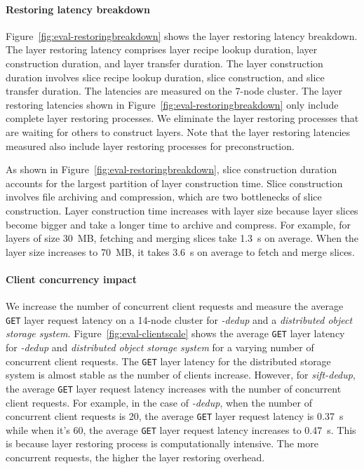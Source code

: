 \paragraph{Restoring latency breakdown}

Figure~\ref{fig:eval-restoringbreakdown} shows 
the layer restoring latency breakdown.
The layer restoring latency comprises layer recipe lookup duration, layer construction duration, and layer transfer duration.
The layer construction duration involves slice recipe lookup duration, slice construction, and slice transfer duration.
%
The latencies are measured on the 7-node cluster.
The layer restoring latencies shown in Figure~\ref{fig:eval-restoringbreakdown} only include complete layer restoring processes. 
We eliminate the layer restoring processes that are waiting for others to construct layers.
Note that the layer restoring latencies measured also include layer restoring processes for preconstruction.

As shown in Figure~\ref{fig:eval-restoringbreakdown}, slice construction duration accounts for the largest partition of layer construction time.
Slice construction involves file archiving and compression, which are two bottlenecks of slice construction. 
Layer construction time increases with layer size because layer slices become bigger and take a longer time to archive and compress.
For example, for layers of size 30~MB, fetching and merging slices take 1.3~s on average.
When the layer size increases to 70~MB, it takes 3.6~s on average to fetch and merge slices.

\paragraph{Client concurrency impact}
We increase the number of concurrent client requests and measure the average \texttt{GET} layer request latency on a 14-node cluster for \emph{\sysname-dedup} and a \emph{distributed object storage system}.
%
Figure~\ref{fig:eval-clientscale} shows
the average \texttt{GET} layer latency for \emph{\sysname-dedup} and \emph{distributed object storage system} for a varying number of concurrent client requests.
The \texttt{GET} layer latency for the distributed storage system is almost stable as the number of clients increase.
However, for \emph{sift-dedup}, the average \texttt{GET} layer request latency increases with the number of concurrent client requests.
For example, in the case of \emph{\sysname-dedup}, when the number of concurrent client requests is 20, the average \texttt{GET} layer request latency is 0.37~s while when it's 60, the average \texttt{GET} layer request latency  increases to 0.47~s.
This is because layer restoring process is computationally intensive.
The more concurrent requests, the higher the layer restoring overhead.

